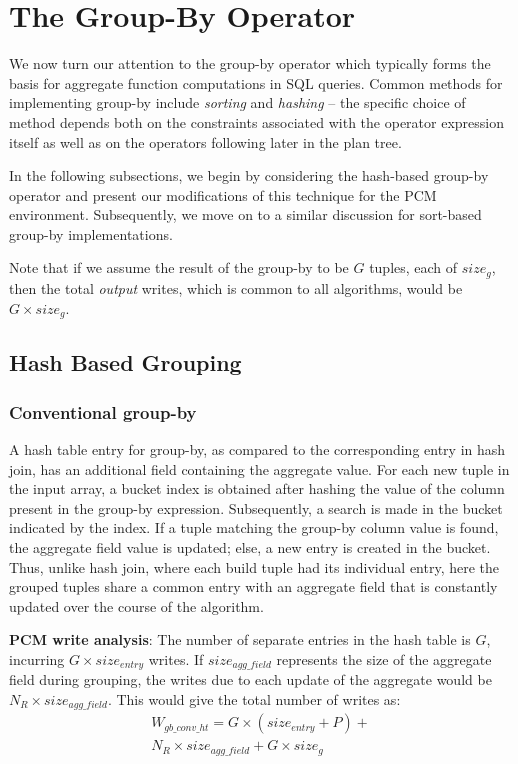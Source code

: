 \section{The Group-By Operator}%
\label{gby}
We now turn our attention to the group-by operator which typically
forms the basis for aggregate function computations in SQL queries.
Common methods for implementing group-by include \textit{sorting} and
\textit{hashing} -- the specific choice of method depends both on the
constraints associated with the operator expression itself as well as
on the operators following later in the plan tree.

In the following subsections, we begin by considering the hash-based
group-by operator and present our modifications of this technique for
the PCM environment. Subsequently, we move on to a similar discussion
for sort-based group-by implementations.

Note that if we assume the result of the group-by to be $G$ tuples,
each of $size_g$, then the total \emph{output} writes, which is common
to all algorithms, would be $G \times size_g$.

\subsection{Hash Based Grouping}

\subsubsection{Conventional group-by}
A hash table entry for group-by, as compared to the corresponding
entry in hash join, has an additional field containing the aggregate
value. For each new tuple in the input array, a bucket index is
obtained after hashing the value of the column present in the group-by
expression. Subsequently, a search is made in the bucket indicated by
the index. If a tuple matching the group-by column value is found, the
aggregate field value is updated; else, a new entry is created in the
bucket. Thus, unlike hash join, where each build tuple had its individual
entry, here the grouped tuples share a common entry with an aggregate
field that is constantly updated over the course of the algorithm.

\textbf{PCM write analysis}: The number of separate entries in the
hash table is $G$, incurring $G \times size_{entry}$ writes. If
$size_{agg\_field}$ represents the size of the aggregate field
during grouping, the writes due to each update of the aggregate would be $N_R \times
size_{agg\_field}$. This
would give the total number of writes as:
\begin{equation}
\label{eq:gby_conv_ht}
\begin{split}
W_{gb\_conv\_ht} = G \times (size_{entry} + P) + \\
N_R \times size_{agg\_field} + G \times size_g
\end{split}
\end{equation}

